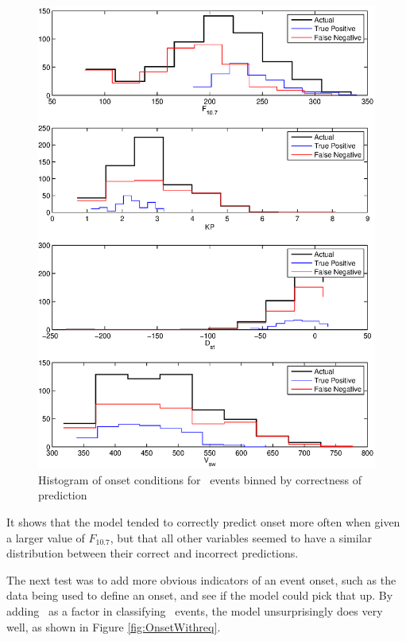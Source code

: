 \begin{figure}[htp!]
	\centering
	\includegraphics[width=0.85\linewidth]{Figures/CH5/NNBinaryOnset-daily-hist.eps}
	\caption{Histogram of onset conditions for \req\ events binned by correctness of prediction}
	\label{fig:OnsetEventsHist}
\end{figure}

It shows that the model tended to correctly predict onset more often when given a larger value of $F_{10.7}$, but that all other variables seemed to have a similar distribution between their correct and incorrect predictions. 

The next test was to add more obvious indicators of an event onset, such as the data being used to define an onset, and see if the model could pick that up. By adding \req\ as a factor in classifying \req\ events, the model unsurprisingly does very well, as shown in Figure \ref{fig:OnsetWithreq}.

